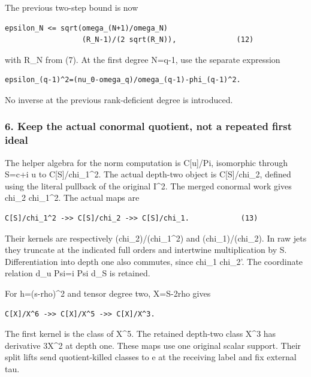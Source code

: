 The previous two-step bound is now

\begin{verbatim}
epsilon_N <= sqrt(omega_(N+1)/omega_N)
                  (R_N-1)/(2 sqrt(R_N)),              (12)
\end{verbatim}

with R\_N from (7). At the first degree N=q-1, use the separate expression

\begin{verbatim}
epsilon_(q-1)^2=(nu_0-omega_q)/omega_(q-1)-phi_(q-1)^2.
\end{verbatim}

No inverse at the previous rank-deficient degree is introduced.

\subsubsection{6. Keep the actual conormal quotient, not a repeated first ideal}\label{endpoint-pr24_current_corrected--keep-the-actual-conormal-quotient-not-a-repeated-first-ideal}

The helper algebra for the norm computation is C{[}u{]}/Pi, isomorphic through S=c+i u to C{[}S{]}/chi\_1\^{}2. The actual depth-two object is C{[}S{]}/chi\_2, defined using the literal pullback of the original I\^{}2. The merged conormal work gives chi\_2 \textbar{} chi\_1\^{}2. The actual maps are

\begin{verbatim}
C[S]/chi_1^2 ->> C[S]/chi_2 ->> C[S]/chi_1.            (13)
\end{verbatim}

Their kernels are respectively (chi\_2)/(chi\_1\^{}2) and (chi\_1)/(chi\_2). In raw jets they truncate at the indicated full orders and intertwine multiplication by S. Differentiation into depth one also commutes, since chi\_1 \textbar{} chi\_2'. The coordinate relation d\_u Psi=i Psi d\_S is retained.

For h=(s-rho)\^{}2 and tensor degree two, X=S-2rho gives

\begin{verbatim}
C[X]/X^6 ->> C[X]/X^5 ->> C[X]/X^3.
\end{verbatim}

The first kernel is the class of X\^{}5. The retained depth-two class X\^{}3 has derivative 3X\^{}2 at depth one. These maps use one original scalar support. Their split lifts send quotient-killed classes to e at the receiving label and fix external tau.


